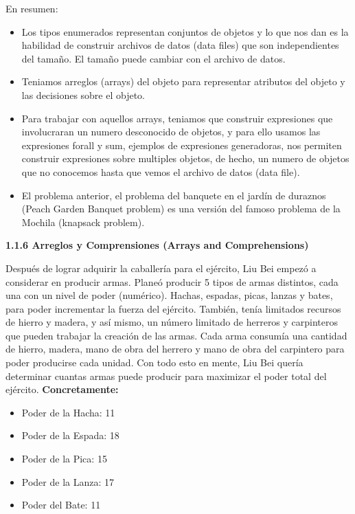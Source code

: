 \documentclass[12pt]{article}
\begin{document}
\begin{justify}
En resumen:
\end{justify}

\begin{itemize}
\item Los tipos enumerados representan conjuntos de objetos y lo que nos dan es la habilidad de construir archivos de datos (data files) que son independientes del tamaño. El tamaño puede cambiar con el archivo de datos.
\item Teniamos arreglos (arrays) del objeto para representar atributos del objeto y las decisiones sobre el objeto.
\item Para trabajar con aquellos arrays, teniamos que construir expresiones que involucraran un numero desconocido de objetos, y para ello usamos las expresiones forall y sum, ejemplos de expresiones generadoras, nos permiten construir expresiones sobre multiples objetos, de hecho, un numero de objetos que no conocemos hasta que vemos el archivo de datos (data file).
\item El problema anterior, el problema del banquete en el jardín de duraznos (Peach Garden Banquet problem) es una versión del famoso problema de la Mochila (knapsack problem).
\end{itemize}

\newpage

\textbf{1.1.6 Arreglos y Comprensiones (Arrays and Comprehensions)}

\begin{justify}
Después de lograr adquirir la caballería para el ejército, Liu Bei empezó a considerar en producir armas. Planeó producir 5 tipos de armas distintos, cada una con un nivel de poder (numérico). Hachas, espadas, picas, lanzas y bates, para poder incrementar la fuerza del ejército. También, tenía limitados recursos de hierro y madera, y así mismo, un número limitado de herreros y carpinteros que pueden trabajar la creación de las armas. Cada arma consumía una cantidad de hierro, madera, mano de obra del herrero y mano de obra del carpintero para poder producirse cada unidad. Con todo esto en mente, Liu Bei quería determinar cuantas armas puede producir para maximizar el poder total del ejército. \textbf{Concretamente:}
\end{justify}

\begin{itemize}
\item Poder de la Hacha: 11
\item Poder de la Espada: 18
\item Poder de la Pica: 15
\item Poder de la Lanza: 17
\item Poder del Bate: 11
\end{itemize}
\end{document}
